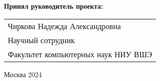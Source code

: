 \begin{titlepage}
\vspace{1em}
{\bf Принял руководитель проекта: \vspace{2mm}}

{
\begin{tabular}{l}
Чиркова Надежда Александровна\\
Научный сотрудник\\
Факультет компьютерных наук НИУ ВШЭ 
\end{tabular}}





\vspace{\fill}

\begin{center}
Москва 2024
\end{center}

\end{titlepage}